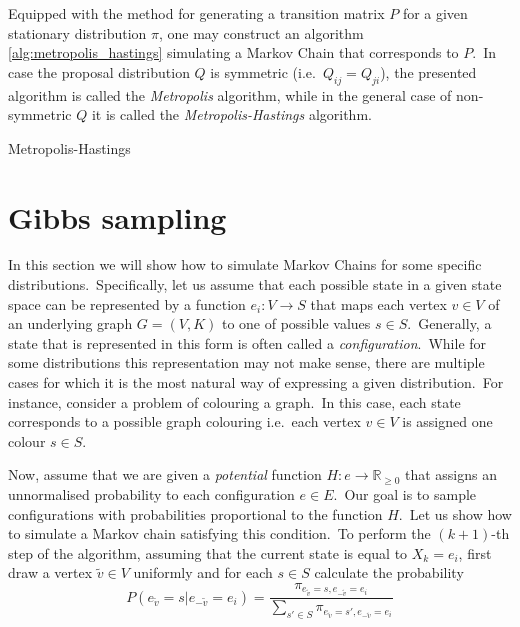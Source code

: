 \documentclass[a4paper, 11pt, onecolumn, openany, titlepage]{report}
\theoremstyle{default_theorem_style}\newtheorem{theorem}{Theorem}
\theoremstyle{default_theorem_style}\newtheorem{definition}{Definition}
\begin{document}
Equipped with the method for generating a transition matrix $P$ for a given stationary distribution $\pi$, one may
construct an algorithm \ref{alg:metropolis_hastings} simulating a Markov Chain that corresponds to $P$.\ In case the
proposal distribution $Q$ is symmetric (i.e.\ $Q_{ij} = Q_{ji}$), the presented algorithm is called the
\textit{Metropolis} algorithm, while in the general case of non-symmetric $Q$ it is called the
\textit{Metropolis-Hastings} algorithm.\newline


\begin{algorithm}[tb]
\caption{Metropolis-Hastings}\label{alg:metropolis_hastings}
\begin{algorithmic}[1]
\Else
\EndIf
{}
\end{algorithmic}
\end{algorithm}

\section{Gibbs sampling}\label{section:gibbs_sampling}

In this section we will show how to simulate Markov Chains for some specific distributions.\ Specifically, let us assume
that each possible state in a given state space can be represented by a function $e_i : V \to S$ that maps each vertex
$v \in V$ of an underlying graph $G = (V, K)$ to one of possible values $s \in S$.\ Generally, a state that is
represented in this form is often called a \textit{configuration}.\ While for some distributions this
representation may not make sense, there are multiple cases for which it is the most natural way of expressing a
given distribution.\ For instance, consider a problem of colouring a graph.\ In this case, each state corresponds to a
possible graph colouring i.e.\ each vertex $v \in V$ is assigned one colour $s \in S$.\newline

Now, assume that we are given a \textit{potential} function $H : e \to \mathbb R_{\geq 0}$ that assigns an
unnormalised probability to each configuration $e \in E$.\ Our goal is to sample configurations with
probabilities proportional to the function $H$.\ Let us show how to simulate a Markov chain satisfying this
condition.\ To perform the $(k + 1)$-th step of the algorithm, assuming that the current state is equal to
$X_k = e_i$, first draw a vertex $\tilde{v} \in V$ uniformly and for each $s \in S$ calculate the probability
$$
P(e_{\tilde{v}} = s | e_{-\tilde{v}} = e_i) = \frac{\pi_{e_{\tilde{v}} =
s,e_{-\tilde{v}} = e_i}}{\sum_{s' \in S} \pi_{e_{\tilde{v}} = s', e_{-\tilde{v}} = e_i}}
$$
\end{document}
